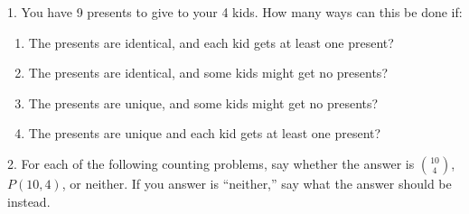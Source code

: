 \documentclass[10pt,]{book}
\theoremstyle{plain}
\theoremstyle{definition}
\theoremstyle{definition}
\theoremstyle{definition}
\numberwithin{equation}{chapter}
\begin{document}
\begin{exerciselist}
\item[1.]\hypertarget{exercise-102}{}
            You have 9 presents to give to your 4 kids. How many ways can this be done if:
\leavevmode%
\begin{enumerate}[label=(\alph*)]
\item\hypertarget{li-659}{}
                The presents are identical, and each kid gets at least one present?
\item\hypertarget{li-660}{}
                The presents are identical, and some kids might get no presents?
\item\hypertarget{li-661}{}
                The presents are unique, and some kids might get no presents?
\item\hypertarget{li-662}{}
                The presents are unique and each kid gets at least one present?
\end{enumerate}
\par\smallskip
\item[2.]\hypertarget{exercise-103}{}
            For each of the following counting problems, say whether the answer is \({10\choose 4}\), \(P(10,4)\), or neither.
            If you answer is ``neither,'' say what the answer should be instead.


\end{exerciselist}
\end{document}
